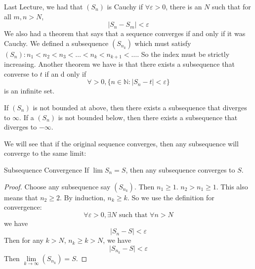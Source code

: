 \documentclass{report}
\begin{document}
Last Lecture, we had that $(S_{n})$ is Cauchy if $\forall \varepsilon > 0$, there is an $N$ such that for all $m, n > N$,
    \begin{equation*}
        \lvert S_{n} - S_{m} \rvert < \varepsilon
    \end{equation*}
We also had a theorem that says that a sequence converges if and only if it was Cauchy. We defined a subsequence $(S_{n_{k}})$ which must satisfy $(S_{n}): n_{1} < n_{2}< n_{3} <  \ldots < n_{k} <  n_{k + 1} < \ldots $. So the index must be strictly increasing. Another theorem we have is that there exists a subsequence that converse to $t$ if an d only if 
    \begin{equation*}
        \forall  > 0, \{n \in \mathbb{N}: \lvert S_{n} - t \rvert < \varepsilon\}
    \end{equation*}
is an infinite set.

If $(S_{n})$ is not bounded at above, then there exists a subsequence that diverges to $\infty$. If a $(S_{n})$ is not bounded below, then there exists a subsequence that diverges to $-\infty$.

We will see that if the original sequence converges, then any subsequence will converge to the same limit:

\begin{theorem}{Subsequence Convergence}
    If $\lim S_{n} = S$, then any subsequence converges to $S$.
\end{theorem}
    \begin{proof}
        Choose any subsequence say $(S_{n_{k}})$. Then $n_{1} \geq 1$. $n_{2} > n_{1} \geq 1$. This also means that $n_{2} \geq 2$. By induction, $n_{k} \geq k$. So we use the definition for convergence:
            \begin{equation*}
                \forall \varepsilon > 0, \exists N \text{ such that } \forall n > N
            \end{equation*}
        we have
            \begin{equation*}
                \lvert S_{n} - S \rvert < \varepsilon
            \end{equation*}
        Then for any $k > N$, $n_{k} \geq k > N$, we have
            \begin{equation*}
                \lvert S_{n_{k}} - S \rvert < \varepsilon
            \end{equation*}
        Then $\lim\limits_{k \to \infty}(S_{n_{k}}) = S$.
    \end{proof}
\end{document}
